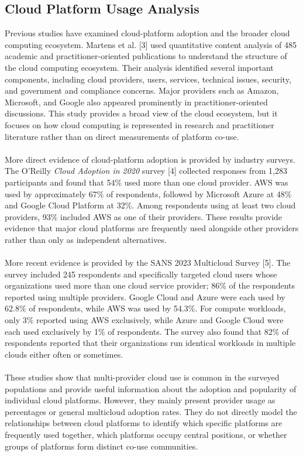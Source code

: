 \documentclass{article}
\begin{document}
\subsection{Cloud Platform Usage Analysis}
\begin{itemize}
{\color{mygreen} 

Previous studies have examined cloud-platform adoption and the broader cloud computing ecosystem. Martens et al. [3] used quantitative content analysis of 485 academic and practitioner-oriented publications to understand the structure of the cloud computing ecosystem. Their analysis identified several important components, including cloud providers, users, services, technical issues, security, and government and compliance concerns. Major providers such as Amazon, Microsoft, and Google also appeared prominently in practitioner-oriented discussions. This study provides a broad view of the cloud ecosystem, but it focuses on how cloud computing is represented in research and practitioner literature rather than on direct measurements of platform co-use.
\\\\
More direct evidence of cloud-platform adoption is provided by industry surveys. The O'Reilly \textit{Cloud Adoption in 2020} survey [4] collected responses from 1,283 participants and found that 54\% used more than one cloud provider. AWS was used by approximately 67\% of respondents, followed by Microsoft Azure at 48\% and Google Cloud Platform at 32\%. Among respondents using at least two cloud providers, 93\% included AWS as one of their providers. These results provide evidence that major cloud platforms are frequently used alongside other providers rather than only as independent alternatives.
\\\\
More recent evidence is provided by the SANS 2023 Multicloud Survey [5]. The survey included 245 respondents and specifically targeted cloud users whose organizations used more than one cloud service provider; 86\% of the respondents reported using multiple providers. Google Cloud and Azure were each used by 62.8\% of respondents, while AWS was used by 54.3\%. For compute workloads, only 3\% reported using AWS exclusively, while Azure and Google Cloud were each used exclusively by 1\% of respondents. The survey also found that 82\% of respondents reported that their organizations run identical workloads in multiple clouds either often or sometimes.
\\\\
These studies show that multi-provider cloud use is common in the surveyed populations and provide useful information about the adoption and popularity of individual cloud platforms. However, they mainly present provider usage as percentages or general multicloud adoption rates. They do not directly model the relationships between cloud platforms to identify which specific platforms are frequently used together, which platforms occupy central positions, or whether groups of platforms form distinct co-use communities.

}
\end{itemize}
\end{document}
